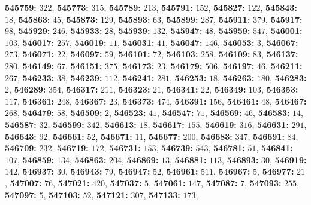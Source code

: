 \textsf{\bfseries 545759:} $322$, \textsf{\bfseries 545773:} $315$, \textsf{\bfseries 545789:} $213$, \textsf{\bfseries 545791:} $152$, \textsf{\bfseries 545827:} $122$, \textsf{\bfseries 545843:} $18$, \textsf{\bfseries 545863:} $45$, \textsf{\bfseries 545873:} $129$, \textsf{\bfseries 545893:} $63$, \textsf{\bfseries 545899:} $287$, \textsf{\bfseries 545911:} $379$, \textsf{\bfseries 545917:} $98$, \textsf{\bfseries 545929:} $246$, \textsf{\bfseries 545933:} $28$, \textsf{\bfseries 545939:} $132$, \textsf{\bfseries 545947:} $48$, \textsf{\bfseries 545959:} $547$, \textsf{\bfseries 546001:} $103$, \textsf{\bfseries 546017:} $257$, \textsf{\bfseries 546019:} $11$, \textsf{\bfseries 546031:} $41$, \textsf{\bfseries 546047:} $146$, \textsf{\bfseries 546053:} $3$, \textsf{\bfseries 546067:} $273$, \textsf{\bfseries 546071:} $22$, \textsf{\bfseries 546097:} $59$, \textsf{\bfseries 546101:} $72$, \textsf{\bfseries 546103:} $258$, \textsf{\bfseries 546109:} $83$, \textsf{\bfseries 546137:} $280$, \textsf{\bfseries 546149:} $67$, \textsf{\bfseries 546151:} $375$, \textsf{\bfseries 546173:} $23$, \textsf{\bfseries 546179:} $506$, \textsf{\bfseries 546197:} $46$, \textsf{\bfseries 546211:} $267$, \textsf{\bfseries 546233:} $38$, \textsf{\bfseries 546239:} $112$, \textsf{\bfseries 546241:} $281$, \textsf{\bfseries 546253:} $18$, \textsf{\bfseries 546263:} $180$, \textsf{\bfseries 546283:} $2$, \textsf{\bfseries 546289:} $354$, \textsf{\bfseries 546317:} $211$, \textsf{\bfseries 546323:} $21$, \textsf{\bfseries 546341:} $22$, \textsf{\bfseries 546349:} $103$, \textsf{\bfseries 546353:} $117$, \textsf{\bfseries 546361:} $248$, \textsf{\bfseries 546367:} $23$, \textsf{\bfseries 546373:} $474$, \textsf{\bfseries 546391:} $156$, \textsf{\bfseries 546461:} $48$, \textsf{\bfseries 546467:} $268$, \textsf{\bfseries 546479:} $58$, \textsf{\bfseries 546509:} $2$, \textsf{\bfseries 546523:} $41$, \textsf{\bfseries 546547:} $71$, \textsf{\bfseries 546569:} $46$, \textsf{\bfseries 546583:} $14$, \textsf{\bfseries 546587:} $32$, \textsf{\bfseries 546599:} $342$, \textsf{\bfseries 546613:} $18$, \textsf{\bfseries 546617:} $155$, \textsf{\bfseries 546619:} $316$, \textsf{\bfseries 546631:} $291$, \textsf{\bfseries 546643:} $92$, \textsf{\bfseries 546661:} $52$, \textsf{\bfseries 546671:} $11$, \textsf{\bfseries 546677:} $200$, \textsf{\bfseries 546683:} $347$, \textsf{\bfseries 546691:} $84$, \textsf{\bfseries 546709:} $232$, \textsf{\bfseries 546719:} $172$, \textsf{\bfseries 546731:} $153$, \textsf{\bfseries 546739:} $543$, \textsf{\bfseries 546781:} $51$, \textsf{\bfseries 546841:} $107$, \textsf{\bfseries 546859:} $134$, \textsf{\bfseries 546863:} $204$, \textsf{\bfseries 546869:} $13$, \textsf{\bfseries 546881:} $113$, \textsf{\bfseries 546893:} $30$, \textsf{\bfseries 546919:} $142$, \textsf{\bfseries 546937:} $30$, \textsf{\bfseries 546943:} $79$, \textsf{\bfseries 546947:} $52$, \textsf{\bfseries 546961:} $511$, \textsf{\bfseries 546967:} $5$, \textsf{\bfseries 546977:} $21$, \textsf{\bfseries 547007:} $76$, \textsf{\bfseries 547021:} $420$, \textsf{\bfseries 547037:} $5$, \textsf{\bfseries 547061:} $147$, \textsf{\bfseries 547087:} $7$, \textsf{\bfseries 547093:} $255$, \textsf{\bfseries 547097:} $5$, \textsf{\bfseries 547103:} $52$, \textsf{\bfseries 547121:} $307$, \textsf{\bfseries 547133:} $173$, 
